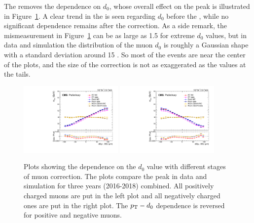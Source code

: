The \GeoFit removes the \pt dependence on $d_0$, 
whose overall effect on the \zmm peak is illustrated in Figure~\ref{fig:mucal_d0_run2}.
A clear trend in the \mmm is seen regarding $d_0$ before the \GeoFit, 
while no significant dependence remains after the correction.
As a side remark, the \mmm mismeasurement in Figure~\ref{fig:mucal_d0_run2} can be as large as 1.5 \GeV for extreme $d_0$ values,
but in data and simulation the distribution of the muon $d_0$ is roughly a Gaussian shape with a standard deviation around 15 \mum.
So most of the events are near the center of the plots, and the size of the correction is not as exaggerated as the values at the tails. 

\begin{figure}[!htb]
      \centering
      \includegraphics[width=0.45\textwidth]{pics/muon_corr/GeoFit/performance/muP_d0_summary_mean.pdf}
      \includegraphics[width=0.45\textwidth]{pics/muon_corr/GeoFit/performance/muN_d0_summary_mean.pdf}
      \caption{Plots showing the \pt dependence on the $d_0$ value with different stages of muon correction.
               The plots compare the \zmm peak in data and simulation for three years (2016-2018) combined.
               All positively charged muons are put in the left plot and all negatively charged ones are put in the right plot.
               The $p_{\mathrm{T}}-d_0$ dependence is reversed for positive and negative muons.
               }
      \label{fig:mucal_d0_run2}
\end{figure}


